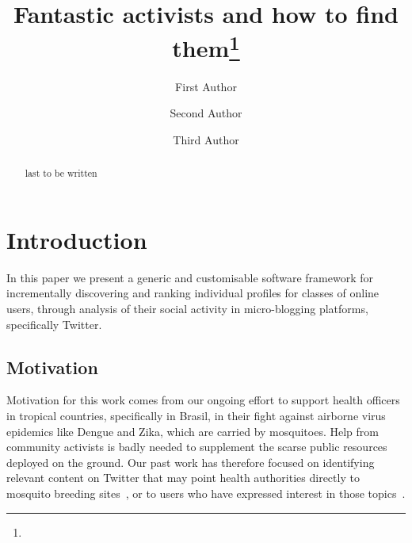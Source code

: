 \documentclass[runningheads]{llncs}
\begin{document}
%
\title{Fantastic activists and how to find them\thanks{}}
%
%
\author{First Author \and
Second Author \and
Third Author}
%
%
%
\maketitle              %
%
\begin{abstract}
last to be written
\end{abstract}
%

%
%
\section{Introduction}

In this paper we present a generic and customisable software  framework for incrementally discovering and ranking  individual profiles for classes of online users, through analysis of their social activity in micro-blogging platforms, specifically Twitter.

\subsection{Motivation}  \label{sec:motivation}

Motivation for this work comes from our ongoing effort to  support health officers in tropical countries, specifically in Brasil, in their fight against airborne virus epidemics like Dengue and Zika, which are carried by mosquitoes. Help from community activists is badly needed to supplement the scarse public resources deployed on the ground. Our past work has therefore focused on identifying relevant content on Twitter that may point health authorities directly to mosquito breeding sites~\cite{Sousa2018}, or to users who have expressed interest in those topics~\cite{Missier2017}. 
\end{document}
